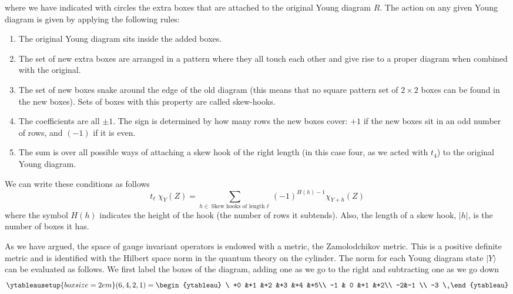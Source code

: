 \documentclass[12pt,nofootinbib, longbibliography]{revtex4-1}
\newcommand\ket[1]{| #1\rangle}
\begin{document}
where we have indicated with circles the extra boxes that are attached to the original Young diagram $R$.
The action on any given Young diagram is given by applying the following rules: 
\begin{enumerate}
\item The original Young diagram sits inside the added boxes. 
\item 
The set of new extra boxes are arranged in a pattern where they all touch each other and give rise to a proper diagram when combined with the original. 
\item The set of new boxes snake around the edge of the old diagram (this means that no square pattern set of $2\times 2$ boxes  can be found in the new boxes). Sets of boxes with this property are called skew-hooks.
\item 
The coefficients are all $\pm 1$. The sign is determined by how many rows the new boxes cover: $+1$ if the new boxes sit in an odd number of rows, and $(-1)$ if it is even. 
\item
The sum is over all possible ways of attaching a skew hook of the right length (in this case four, as we acted with $t_4$) to the original Young diagram.
\end{enumerate}
We can write these conditions as follows
\begin{equation}
t_\ell\;\chi_Y(Z) = \sum_{h\in\text{Skew hooks of length $\ell$}} (-1)^{H(h)-1} \chi_{Y+h}(Z)\label{eq:action}
\end{equation}
where the symbol $H(h)$ indicates the height of the hook (the number of rows it subtends). Also, the length of a skew hook, $|h|$, is the number of boxes it has.

As we have argued, the space of gauge invariant operators is endowed with a metric, the Zamolodchikov metric. This is a positive definite metric and is identified with the Hilbert space norm in the quantum theory on the cylinder. The norm  for each Young diagram state $\ket Y$ can be evaluated as follows. We first label the boxes of the diagram, adding one as we go to the right and subtracting one as we go down
\begin{equation}\ytableausetup{boxsize=2em}
(6,4,2,1) = \begin{ytableau} 
\ +0 &+1 &+2 &+3 &+4 &+5\\
-1 & 0 &+1 &+2\\
-2&-1 \\
-3 \
\end{ytableau}
\end{equation}
\end{document}
